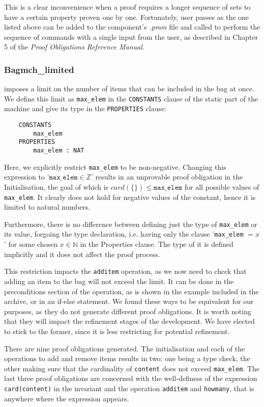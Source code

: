 \documentclass[11pt,journal]{IEEEtran}
\begin{document}
	This is a clear inconvenience when a proof requires a longer sequence of sets to have a certain property proven one by one. Fortunately, user passes as the one listed above can be added to the component's \emph{.pmm} file and called to perform the sequence of commands with a single input from the user, as described in Chapter 5 of the \emph{Proof Obligations Reference Manual}.
	
	
	\subsubsection{Bagmch\_limited} imposes a limit on the number of items that can be included in the bag at once. We define this limit as \texttt{max\_elem} in the \texttt{CONSTANTS} clause of the static part of the machine and give its type in the \texttt{PROPERTIES} clause:
	
	\begin{lstlisting}
	CONSTANTS
		max_elem
	PROPERTIES
		max_elem : NAT
	\end{lstlisting}
	
	Here, we explicitly restrict \texttt{max\_elem} to be non-negative. Changing this expression to '$\texttt{max\_elem} \in \mathbb{Z}$' results in an unprovable proof obligation in the Initialisation, the goal of which is $card(\{\}) \leq \texttt{max\_elem}$ for all possible values of \texttt{max\_elem}. It clearly does not hold for negative values of the constant, hence it is limited to natural numbers.
	
	Furthermore, there is no difference between defining just the type of \texttt{max\_elem} or its value, forgoing the type declaration, i.e. having only the clause '\texttt{max\_elem} $= x$' for some chosen $x \in \mathbb{N}$ in the Properties clause. The type of it is defined implicitly and it does not affect the proof process.

	This restriction impacts the \texttt{additem} operation, as we now need to check that adding an item to the bag will not exceed the limit. It can be done in the preconditions section of the operation, as is shown in the example included in the archive, or in an if-else statement. We found these ways to be equivalent for our purposes, as they do not generate different proof obligations. It is worth noting that they will impact the refinement stages of the development. We have elected to stick to the former, since it is less restricting for potential refinement.
	
	There are nine proof obligations generated. The initialisation and each of the operations to add and remove items results in two: one being a type check, the other making sure that the cardinality of \texttt{content} does not exceed \texttt{max\_elem}. The last three proof obligations are concerned with the well-definess of the expression \texttt{card(content)} in the invariant and the operation \texttt{additem} and \texttt{howmany}, that is anywhere where the expression appears.
	
\end{document}

